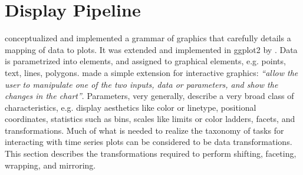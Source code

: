 \documentclass[12pt]{article}
\begin{document}



\section{Display Pipeline\label{sec:Pipeline}}

\citet{wilkinson2000language, wilkinson2001nvizn, wilkinson2006grammar}
conceptualized and implemented a grammar of graphics that
carefully details a mapping of data to plots. It was extended
and implemented in ggplot2 by \citet{ggplot2}. Data is
parametrized into elements, and assigned to graphical elements,
e.g. points, text, lines, polygons. \citet{wills2012visualizing}
made a simple extension for interactive graphics: \textit{``allow
the user to manipulate one of the two inputs, data or parameters,
and show the changes in the chart''}. Parameters, very generally,
describe a very broad class of characteristics, e.g. display
aesthetics like color or linetype, positional coordinates,
statistics such as bins, scales like limits or color ladders,
facets, and transformations. Much of what is needed to realize
the taxonomy of tasks for interacting with time series plots
can be considered to be data transformations. This section
describes the transformations required to perform shifting,
faceting, wrapping, and mirroring.

\end{document}
